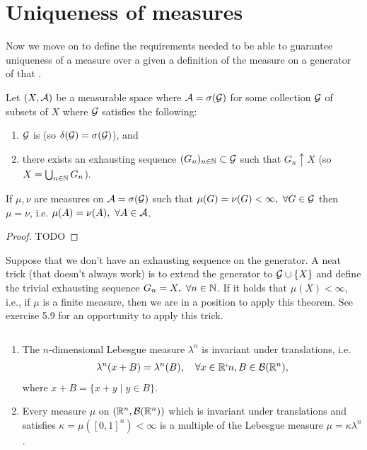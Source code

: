 \section{Uniqueness of measures}

Now we move on to define the requirements needed to be able to guarantee uniqueness of a measure over a \siga given a definition of the measure on a generator of that \siga.

\begin{thm}
	Let $(X, \mathcal{A})$ be a measurable space where $\mathcal{A} = \sigma(\mathcal{G})$ for some collection $\mathcal{G}$ of subsets of $X$ where $\mathcal{G}$ satisfies the following:
	\begin{enumerate}
		\item $\mathcal{G}$ is \istable (so $\delta(\mathcal{G}) = \sigma(\mathcal{G})$), and
		\item there exists an exhausting sequence $(G_n)_{n \in \mathbb{N}} \subset \mathcal{G}$ such that $G_n\uparrow X$ (so $X = \bigcup_{n\in\mathbb{N}}G_n$). 
	\end{enumerate}

	If $\mu, \nu$ are measures on $\mathcal{A} = \sigma(\mathcal{G})$ such that $\mu(G) = \nu(G) < \infty,\ \forall G \in \calG$ then $\mu = \nu$, i.e. $\mu(A) = \nu(A),\ \forall A \in \mathcal{A}$.
\end{thm}

\begin{proof}
	TODO
\end{proof}

Suppose that we don't have an exhausting sequence on the generator. A neat trick (that doesn't always work) is to extend the generator to $\mathcal{G} \cup \{X\}$ and define the trivial exhausting sequence $G_n = X,\ \forall n \in \mathbb{N}$. If it holds that $\mu(X) < \infty$, i.e., if $\mu$ is a finite measure, then we are in a position to apply this theorem. See exercise 5.9 for an opportunity to apply this trick.

\begin{lem}$ $\newline
	\begin{enumerate}
		\item The $n$-dimensional Lebesgue measure $\lambda^n$ is invariant under translations, i.e.
		\begin{align*}
			\lambda^n(x + B) = \lambda^n(B),\quad \forall x \in \mathbb{R}`n, B \in \mathcal{B}(\mathbb{R}^n),
		\end{align*}
		where $x + B = \{x + y \mid y \in B\}$.
		
		\item Every measure $\mu$ on $(\mathbb{R}^n, \mathcal{B}(\mathbb{R}^n))$ which is invariant under translations and satisfies $\kappa = \mu([0,1]^n) < \infty$ is a multiple of the Lebesgue measure $\mu = \kappa \lambda^n$.
	\end{enumerate}
\end{lem}

